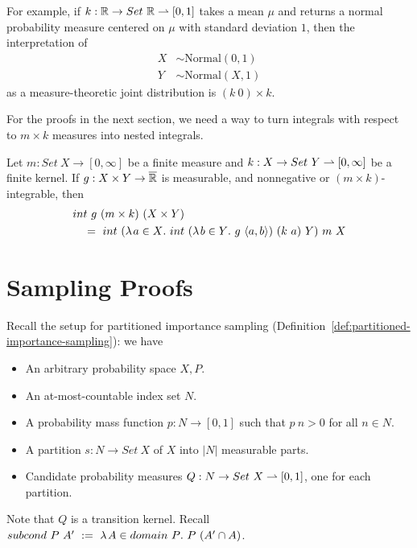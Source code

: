For example, if $k : \mathbb{R} \to Set~\mathbb{R} \rightharpoonup [0,1]$ takes a mean $\mu$ and returns a normal probability measure centered on $\mu$ with standard deviation $1$, then the interpretation of
\begin{equation}
\begin{aligned}
	X &\sim \mathrm{Normal}(0,1)
\\
	Y &\sim \mathrm{Normal}(X,1)
\end{aligned}
\end{equation}
as a measure-theoretic joint distribution is $(k~0) \times k$.

For the proofs in the next section, we need a way to turn integrals with respect to $m \times k$ measures into nested integrals.

\begin{lemma}
\label{lem:fubini-for-transition-kernels}
Let $m : Set~X \to [0,\infty]$ be a finite measure and $k : X \to Set~Y \rightharpoonup [0,\infty]$ be a finite kernel.
If $g : X \times Y \to \cl{\Re}$ is measurable, and nonnegative or $(m \times k)$-integrable, then
\begin{equation}
\begin{aligned}
	&int~g~(m \times k)~(X \times Y)
\\
	&\tab =\ 
	int~(\fun{a \in X} int~(\fun{b \in Y} g~\pair{a,b})~(k~a)~Y)~m~X
\end{aligned}
\end{equation}
\end{lemma}


\section{Sampling Proofs}
\label{sec:sampling-proofs}

Recall the setup for partitioned importance sampling (Definition~\ref{def:partitioned-importance-sampling}): we have
\begin{itemize}
	\item An arbitrary probability space $X,P$.
	\item An at-most-countable index set $N$.
	\item A probability mass function $p : N \to [0,1]$ such that $p~n > 0$ for all $n \in N$.
	\item A partition $s : N \to Set~X$ of $X$ into $|N|$ measurable parts.
	\item Candidate probability measures $Q : N \to Set~X \rightharpoonup [0,1]$, one for each partition.
\end{itemize}
Note that $Q$ is a transition kernel.
Recall $subcond~P~A'\ :=\ \fun{A \in domain~P} P~(A' \i A)$.

